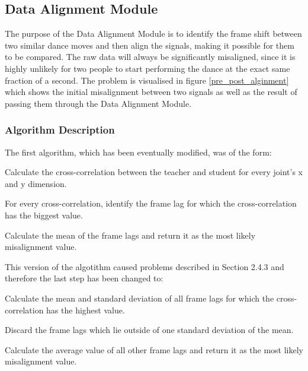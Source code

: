 \documentclass[11pt,a4paper]{article}
\begin{document}
\clearpage
\subsection{Data Alignment Module}
\noindent
The purpose of the Data Alignment Module is to identify the frame shift between two similar dance moves and then align the signals, making it possible for them to be compared. The raw data will always be significantly misaligned, since it is highly unlikely for two people to start performing the dance at the exact same fraction of a second. The problem is visualised in figure \ref{pre_post_alginment} which shows the initial misalignment between two signals as well as the result of passing them through the Data Alignment Module.

\subsubsection{Algorithm Description}
\noindent
The first algorithm, which has been eventually modified, was of the form:
\begin{compactitem}
\setlength{\itemsep}{1pt}
\setlength{\parskip}{0pt}
\setlength{\parsep}{0pt}
	\item Calculate the cross-correlation between the teacher and student for every joint's x and y dimension.
	\item For every cross-correlation, identify the frame lag for which the cross-correlation has the biggest value.
	\item Calculate the mean of the frame lags and return it as the most likely misalignment value.
\end{compactitem}
This version of the algotithm caused problems described in Section 2.4.3 and therefore the last step has been changed to:
\begin{compactitem}
\setlength{\itemsep}{1pt}
\setlength{\parskip}{0pt}
\setlength{\parsep}{0pt}
	\item Calculate the mean and standard deviation of all frame lags for which the cross-correlation has the highest value.
	\item Discard the frame lags which lie outside of one standard deviation of the mean.
	\item Calculate the average value of all other frame lags and return it as the most likely misalignment value.
\end{compactitem}
\end{document}
